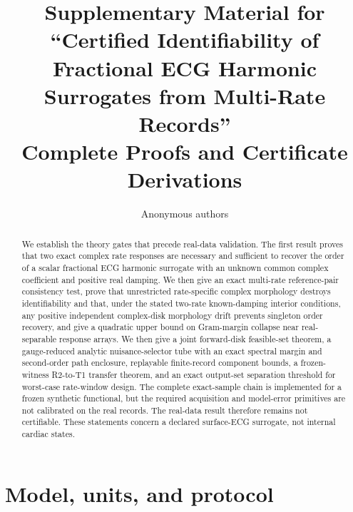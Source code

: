 \documentclass[11pt]{article}
\title{Supplementary Material for ``Certified Identifiability of Fractional
ECG Harmonic Surrogates from Multi-Rate Records''\\
Complete Proofs and Certificate Derivations}
\author{Anonymous authors}
\date{}
\theoremstyle{definition}
\theoremstyle{remark}
\begin{document}
\maketitle

\begin{abstract}
We establish the theory gates that precede real-data validation.  The first
result proves that two exact complex rate responses are necessary and
sufficient to recover the order of a scalar fractional ECG harmonic surrogate
with an unknown common complex coefficient and positive real damping.  We then
give an exact multi-rate reference-pair consistency test, prove that
unrestricted rate-specific complex morphology destroys identifiability and
that, under the stated two-rate known-damping interior conditions, any
positive independent complex-disk morphology drift prevents singleton order
recovery, and give a quadratic upper bound on Gram-margin collapse near
real-separable response arrays.
We then give a joint forward-disk feasible-set theorem, a gauge-reduced analytic
nuisance-selector tube with an exact spectral margin and second-order path
enclosure, replayable finite-record component bounds, a frozen-witness
R2-to-T1 transfer theorem, and an exact output-set separation threshold for
worst-case rate-window design.  The complete exact-sample chain is implemented
for a frozen synthetic functional, but the required acquisition and
model-error primitives are not calibrated on the real records.  The real-data
result therefore remains not certifiable.  These statements concern a
declared surface-ECG surrogate, not internal cardiac states.
\end{abstract}

\section{Model, units, and protocol}
\end{document}
